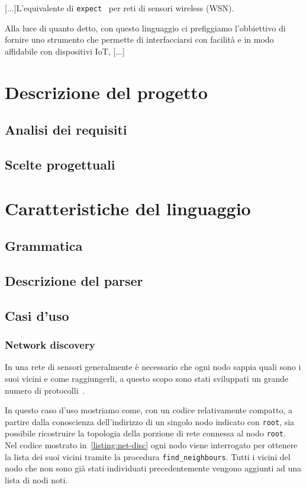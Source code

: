 \documentclass[]{article}
\begin{document}
[...]L'equivalente di \texttt{expect}~\cite{libes1991expect, libes1990expect} per reti di sensori wireless (WSN).

Alla luce di quanto detto, con questo linguaggio ci prefiggiamo l'obbiettivo di fornire uno strumento che permette di interfacciarsi con facilità e in modo affidabile con dispositivi IoT, [...]

\section{Descrizione del progetto}\label{section:descrizione}
\subsection{Analisi dei requisiti}
\subsection{Scelte progettuali}
\section{Caratteristiche del linguaggio}\label{section:caratteristiche-linguaggio}
\subsection{Grammatica}
\subsection{Descrizione del parser}
\subsection{Casi d'uso}\label{subsection:casi-d_uso}
\subsubsection{Network discovery}\label{subsubsection:net-disc}
In una rete di sensori generalmente è necessario che ogni nodo sappia quali sono i suoi vicini e come raggiungerli, a questo scopo sono stati sviluppati un grande numero di protocolli~\cite{narten1998neighbor, kandhalu2010u, alsa2012secure}.

In questo caso d'uso mostriamo come, con un codice relativamente compatto, a partire dalla conoscienza dell'indirizzo di un singolo nodo indicato con \texttt{root}, sia possibile ricostruire la topologia della porzione di rete connessa al nodo \texttt{root}.\\
Nel codice mostrato in~\ref{listing:net-disc} ogni nodo viene interrogato per ottenere la lista dei suoi vicini tramite la procedura \texttt{find\_neighbours}. Tutti i vicini del nodo che non sono già stati individuati precedentemente vengono aggiunti ad una lista di nodi noti.
\end{document}
